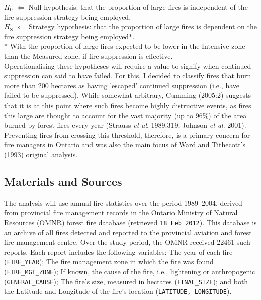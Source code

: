\begin{spacing}{1.5}
\noindent $H_{\mathrm{0}}$ $\Leftarrow$ Null hypothesis: that the proportion of large fires is independent of the fire suppression strategy being employed. \\

\noindent $H_{\mathrm{S}}$ $\Leftarrow$ Strategy hypothesis: that the proportion of large fires is dependent on the fire suppression strategy being employed$\ast$. \\

\noindent $\ast$ With the proportion of large fires expected to be lower in the Intensive zone than the Measured zone, if fire suppression is effective. \\

Operationalising these hypotheses will require a value to signify when continued suppression can said to have failed. For this, I decided to classify fires that burn more than 200 hectares as having 'escaped' continued suppression (i.e., have failed to be suppressed). While somewhat arbitrary, Cumming (2005:2) suggests that it is at this point where such fires become highly distructive events, as fires this large are thought to account for the vast majority (up to 96\%) of the area burned by forest fires every year (Strauss \emph{et al}. 1989:319; Johnson \emph{et al}. 2001). Preventing fires from crossing this threshold, therefore, is a primary concern for fire managers in Ontario and was also the main focus of Ward and Tithecott's (1993) original analysis.

\subsection{Materials and Sources}

The analysis will use annual fire statistics over the period 1989--2004, derived from provincial fire management records in the Ontario Ministry of Natural Resources (OMNR) forest fire database (retrieved \texttt{18 Feb 2012}). This database is an archive of all fires detected and reported to the provincial aviation and forest fire management centre. Over the study period, the OMNR received 22461 such reports. Each report includes the following variables: The year of each fire (\texttt{FIRE\_YEAR}); The fire management zone in which the fire was found (\texttt{FIRE\_MGT\_ZONE}); If known, the cause of the fire, i.e., lightening or anthropogenic (\texttt{GENERAL\_CAUSE}); The fire's size, measured in hectares (\texttt{FINAL\_SIZE}); and both the Latitude and Longitude of the fire's location (\texttt{LATITUDE, LONGITUDE}).


\end{spacing}
